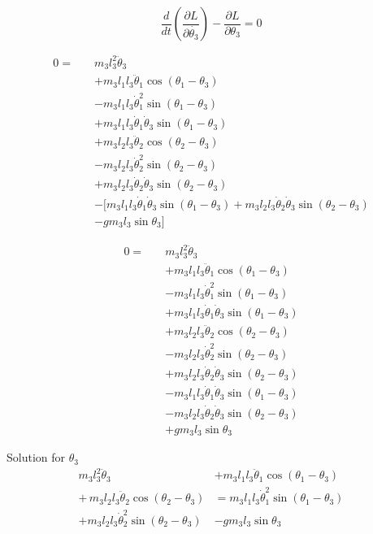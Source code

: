 \documentclass[11pt,a4paper]{article}
\begin{document}
\[ \frac{d}{dt} \left( \frac{\partial L}{\partial \dot{\theta_3}} \right) - \frac{\partial L}{\partial \theta_3} = 0 \]

\begin{align*}
    0 = \quad &m_3  l_3^2 \ddot{\theta}_3 \\
    &+ m_3 l_1 l_3 \ddot{\theta}_1 \cos(\theta_1 - \theta_3) \\
    &- m_3 l_1 l_3 \dot{\theta}_1^2 \sin(\theta_1 - \theta_3) \\
    &+ m_3 l_1 l_3 \dot{\theta}_1 \dot{\theta}_3 \sin(\theta_1 - \theta_3) \\
    &+ m_3 l_2 l_3 \ddot{\theta}_2 \cos(\theta_2 - \theta_3) \\
    &- m_3 l_2 l_3 \dot{\theta}_2^2 \sin(\theta_2 - \theta_3) \\
    &+ m_3 l_2 l_3 \dot{\theta}_2 \dot{\theta}_3 \sin(\theta_2 - \theta_3) \\
    &- \Biggl[m_3 l_1 l_3 \dot{\theta}_1 \dot{\theta}_3 \sin(\theta_1 - \theta_3) + m_3 l_2 l_3 \dot{\theta}_2 \dot{\theta}_3 \sin(\theta_2 - \theta_3) \\
    &- g m_3 l_3 \sin\theta_3 \Biggr]
\end{align*}

\begin{align*}
    0 = \quad &m_3  l_3^2 \ddot{\theta}_3 \\
    &+ m_3 l_1 l_3 \ddot{\theta}_1 \cos(\theta_1 - \theta_3) \\
    &- m_3 l_1 l_3 \dot{\theta}_1^2 \sin(\theta_1 - \theta_3) \\
    &+ m_3 l_1 l_3 \dot{\theta}_1 \dot{\theta}_3 \sin(\theta_1 - \theta_3) \\
    &+ m_3 l_2 l_3 \ddot{\theta}_2 \cos(\theta_2 - \theta_3) \\
    &- m_3 l_2 l_3 \dot{\theta}_2^2 \sin(\theta_2 - \theta_3) \\
    &+ m_3 l_2 l_3 \dot{\theta}_2 \dot{\theta}_3 \sin(\theta_2 - \theta_3) \\
    &- m_3 l_1 l_3 \dot{\theta}_1 \dot{\theta}_3 \sin(\theta_1 - \theta_3) \\
    &- m_3 l_2 l_3 \dot{\theta}_2 \dot{\theta}_3 \sin(\theta_2 - \theta_3) \\
    &+ g m_3 l_3 \sin\theta_3
\end{align*}

Solution for $\theta_3$
\begin{align*}
    m_3  l_3^2 \ddot{\theta}_3 &+ m_3 l_1 l_3 \ddot{\theta}_1 \cos(\theta_1 - \theta_3) \\
    + \, m_3 l_2 l_3 \ddot{\theta}_2 \cos(\theta_2 - \theta_3) &= m_3 l_1 l_3 \dot{\theta}_1^2 \sin(\theta_1 - \theta_3) \\
    + m_3 l_2 l_3 \dot{\theta}_2^2 \sin(\theta_2 - \theta_3) &- g m_3 l_3 \sin\theta_3
\end{align*}
\end{document}
